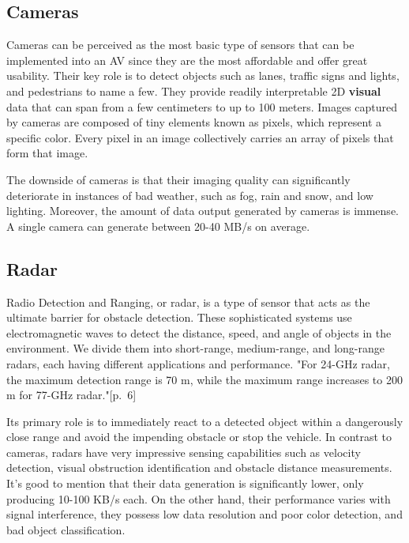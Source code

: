 \documentclass[10pt,oneside,english,a4paper]{article}
\begin{document}
\subsection{Cameras}

\indent Cameras can be perceived as the most basic type of sensors that can be implemented into an AV since they are the most affordable and offer great usability. Their key role is to detect objects such as lanes, traffic signs and lights, and pedestrians to name a few. They provide readily interpretable 2D \textbf{visual} data that can span from a few centimeters to up to 100 meters. Images captured by cameras are composed of tiny elements known as pixels, which represent a specific color. Every pixel in an image collectively carries an array of pixels that form that image. 
\par The downside of cameras is that their imaging quality can significantly deteriorate in instances of bad weather, such as fog, rain and snow, and low lighting. Moreover, the amount of data output generated by cameras is immense. A single camera can generate between 20-40 MB/s on average. \cite{functionalarch}\cite{computerarch}\cite{stateoftheart}

\subsection{Radar}

\indent Radio Detection and Ranging, or radar, is a type of sensor that acts as the ultimate barrier for obstacle detection. These sophisticated systems use electromagnetic waves to detect the distance, speed, and angle of objects in the environment. We divide them into short-range, medium-range, and long-range radars, each having different applications and performance. "For 24-GHz radar, the maximum detection range is 70 m, while the maximum range increases to 200 m for 77-GHz radar."\cite{stateoftheart}[p.~6] 
\par Its primary role is to immediately react to a detected object within a dangerously close range and avoid the impending obstacle or stop the vehicle. In contrast to cameras, radars have very impressive sensing capabilities such as velocity detection, visual obstruction identification and obstacle distance measurements. It's good to mention that their data generation is significantly lower, only producing 10-100 KB/s each. On the other hand, their performance varies with signal interference, they possess low data resolution and poor color detection, and bad object classification. \cite{computerarch}\cite{Sensorfusion}\cite{stateoftheart}
\end{document}
